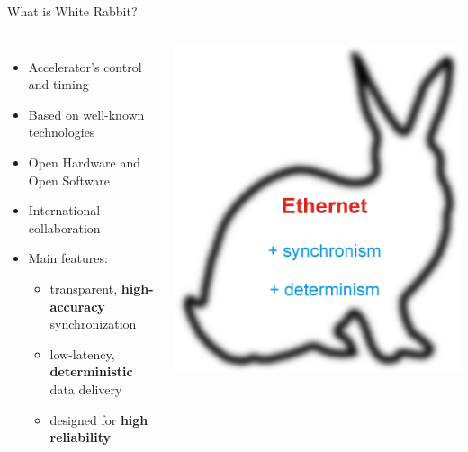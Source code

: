 \documentclass[compress,red]{beamer}
\begin{document}
\begin{frame}{What is White Rabbit?}

\begin{columns}[c]
	  \begin{itemize}
		\item Accelerator's control and timing
		\item Based on well-known technologies
		\item Open Hardware and Open Software
		\item International collaboration
		\item Main features:
		\begin{itemize}
		  \item transparent,  {\bf high-accuracy} synchronization
		  \item low-latency,  {\bf deterministic} data delivery
		  \item designed for  {\bf high reliability}
		\end{itemize}
	  \end{itemize}
		\begin{center}
		\hspace{-0.5cm}
		\includegraphics[width=1.1\textwidth]{misc/rabbit.pdf}
		\end{center}
	\end{columns}

\end{frame}
\end{document}
